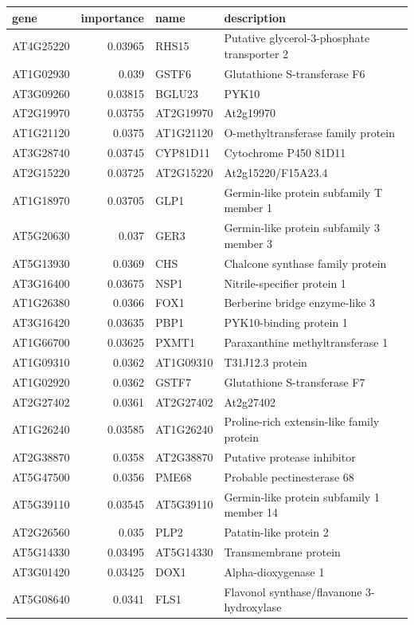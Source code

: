 \documentclass[11pt]{article}
\begin{document}
\begin{center}
\begin{tabular}{lrll}
gene & importance & name & description\\
\hline
AT4G25220 & 0.03965 & RHS15 & Putative glycerol-3-phosphate transporter 2\\
AT1G02930 & 0.039 & GSTF6 & Glutathione S-transferase F6\\
AT3G09260 & 0.03815 & BGLU23 & PYK10\\
AT2G19970 & 0.03755 & AT2G19970 & At2g19970\\
AT1G21120 & 0.0375 & AT1G21120 & O-methyltransferase family protein\\
AT3G28740 & 0.03745 & CYP81D11 & Cytochrome P450 81D11\\
AT2G15220 & 0.03725 & AT2G15220 & At2g15220/F15A23.4\\
AT1G18970 & 0.03705 & GLP1 & Germin-like protein subfamily T member 1\\
AT5G20630 & 0.037 & GER3 & Germin-like protein subfamily 3 member 3\\
AT5G13930 & 0.0369 & CHS & Chalcone synthase family protein\\
AT3G16400 & 0.03675 & NSP1 & Nitrile-specifier protein 1\\
AT1G26380 & 0.0366 & FOX1 & Berberine bridge enzyme-like 3\\
AT3G16420 & 0.03635 & PBP1 & PYK10-binding protein 1\\
AT1G66700 & 0.03625 & PXMT1 & Paraxanthine methyltransferase 1\\
AT1G09310 & 0.0362 & AT1G09310 & T31J12.3 protein\\
AT1G02920 & 0.0362 & GSTF7 & Glutathione S-transferase F7\\
AT2G27402 & 0.0361 & AT2G27402 & At2g27402\\
AT1G26240 & 0.03585 & AT1G26240 & Proline-rich extensin-like family protein\\
AT2G38870 & 0.0358 & AT2G38870 & Putative protease inhibitor\\
AT5G47500 & 0.0356 & PME68 & Probable pectinesterase 68\\
AT5G39110 & 0.03545 & AT5G39110 & Germin-like protein subfamily 1 member 14\\
AT2G26560 & 0.035 & PLP2 & Patatin-like protein 2\\
AT5G14330 & 0.03495 & AT5G14330 & Transmembrane protein\\
AT3G01420 & 0.03425 & DOX1 & Alpha-dioxygenase 1\\
AT5G08640 & 0.0341 & FLS1 & Flavonol synthase/flavanone 3-hydroxylase\\
\end{tabular}
\end{center}
\end{document}
